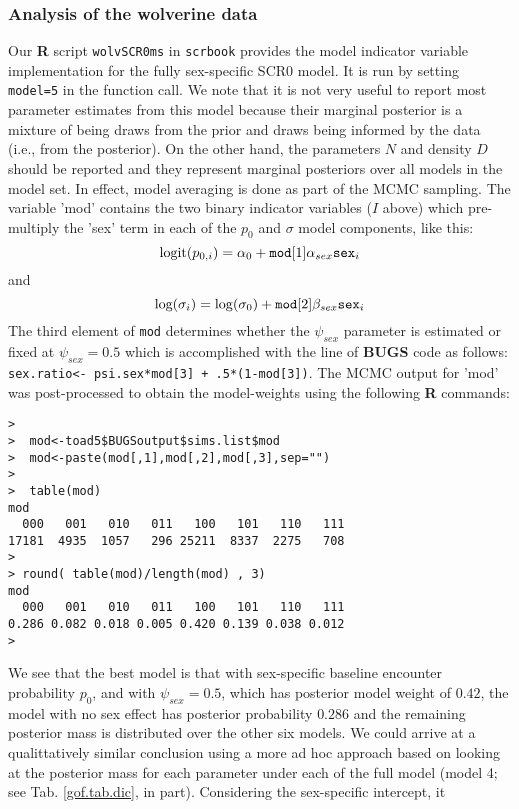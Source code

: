 \subsubsection{Analysis of the wolverine data}

Our {\bf R} script \mbox{\tt wolvSCR0ms} in \mbox{\tt scrbook}
provides the model indicator variable implementation for the fully
sex-specific SCR0 model.  It is run by setting \mbox{\tt model=5} in
the function call. We note that it is not very useful to report most
parameter estimates from this model because their marginal posterior
is a mixture of being draws from the prior and draws being informed by
the data (i.e., from the posterior). On the other hand, the parameters
$N$ and density $D$ should be reported and they represent marginal
posteriors over all models in the model set. In effect, model
averaging is done as part of the MCMC sampling.  The variable 'mod'
contains the two binary indicator variables ($I$ above) which
pre-multiply the 'sex' term in each of the $p_{0}$ and $\sigma$ model
components, like this:
\[
 \mbox{logit}(p_{0,i}) = \alpha_{0} + \mbox{\tt mod}[1] \alpha_{sex} \mbox{\tt sex}_{i}
\]
and
\[
 \mbox{log}(\sigma_{i}) = \log(\sigma_{0}) + \mbox{\tt mod}[2] \beta_{sex} \mbox{\tt sex}_{i}
\]
The third element of \mbox{\tt mod} determines whether the
$\psi_{sex}$ parameter is estimated or fixed at $\psi_{sex} =
0.5$ which is accomplished with the line of {\bf BUGS} code as follows:
\mbox{\tt sex.ratio<- psi.sex*mod[3] + .5*(1-mod[3])}.
The MCMC output for 'mod' was post-processed to obtain the
model-weights using the following  {\bf R} commands:
\begin{verbatim}
> 
>  mod<-toad5$BUGSoutput$sims.list$mod
>  mod<-paste(mod[,1],mod[,2],mod[,3],sep="")
> 
>  table(mod)
mod
  000   001   010   011   100   101   110   111 
17181  4935  1057   296 25211  8337  2275   708 
> 
> round( table(mod)/length(mod) , 3)
mod
  000   001   010   011   100   101   110   111 
0.286 0.082 0.018 0.005 0.420 0.139 0.038 0.012 
> 
\end{verbatim}
We see that the best model is
 that with sex-specific baseline encounter probability
$p_{0}$, and with $\psi_{sex} = 0.5$, which  
 has posterior model weight of $0.42$, the model with no sex
effect has posterior probability $0.286$ and the remaining posterior mass is distributed
over the other six models. We could arrive at a qualittatively similar
conclusion using a more ad hoc approach based on looking at the
posterior mass for each parameter under each of the full model (model
4; see
Tab. \ref{gof.tab.dic}, in part). Considering the sex-specific intercept, it
